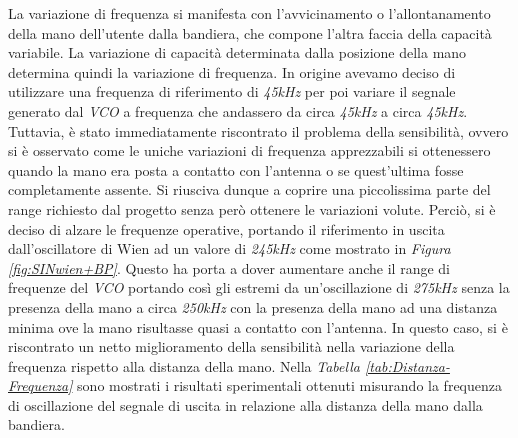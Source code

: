 \documentclass[titlepage]{report}
\begin{document}
	La variazione di frequenza si manifesta con l'avvicinamento o l'allontanamento della mano dell'utente dalla bandiera, che compone l'altra faccia della capacità variabile. La variazione di capacità determinata dalla posizione della mano determina quindi la variazione di frequenza.
	In origine avevamo deciso di utilizzare una frequenza di riferimento di \textit{45kHz} per poi variare il segnale generato dal \textit{VCO} a frequenza che andassero da circa \textit{45kHz} a circa \textit{45kHz}.
	Tuttavia, è stato immediatamente riscontrato il problema della sensibilità, ovvero si è osservato come le uniche variazioni di frequenza apprezzabili si ottenessero quando la mano era posta a contatto con l'antenna o se quest'ultima fosse completamente assente. Si riusciva dunque a coprire una piccolissima parte del range richiesto dal progetto senza però ottenere le variazioni volute.
	Perciò, si è deciso di alzare le frequenze operative, portando il riferimento in uscita dall'oscillatore di Wien ad un valore di \textit{245kHz} come mostrato in \textit{Figura \ref{fig:SINwien+BP}}. Questo ha porta a dover aumentare anche il range di frequenze del \textit{VCO} portando così gli estremi da un'oscillazione di \textit{275kHz} senza la presenza della mano a circa \textit{250kHz} con la presenza della mano ad una distanza minima ove la mano risultasse quasi a contatto con l'antenna.
	In questo caso, si è riscontrato un netto miglioramento della sensibilità nella variazione della frequenza rispetto alla distanza della mano.
	Nella \textit{Tabella \ref{tab:Distanza-Frequenza}} sono mostrati i risultati sperimentali ottenuti misurando la frequenza di oscillazione del segnale di uscita in relazione alla distanza della mano dalla bandiera.

	

	


\end{document}
